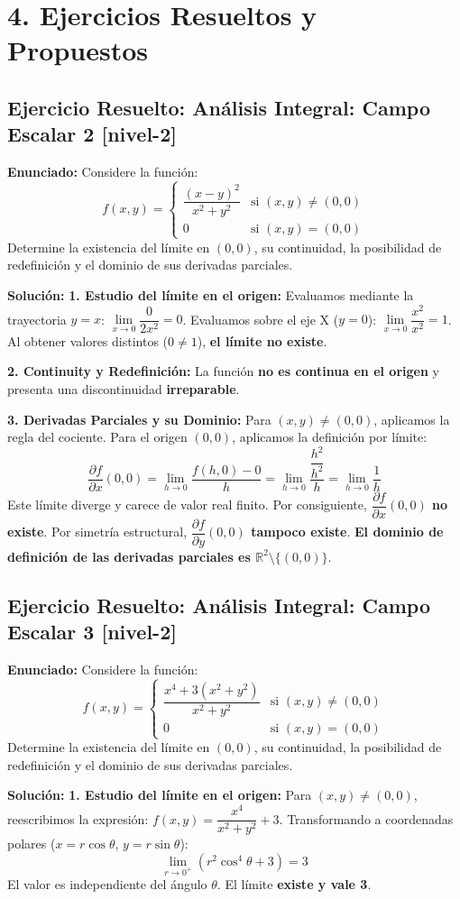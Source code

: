 \documentclass[11pt]{article}
\newenvironment{ejercicios}{%
  \section*{4. Ejercicios Resueltos y Propuestos}%
}{}
\newenvironment{ejercicioresuelto}[2]{\subsection*{Ejercicio Resuelto: #1 \small{[#2]}}}{}
\newcommand{\enunciado}[1]{\textbf{Enunciado:} #1\par\vspace{0.2cm}}
\newcommand{\solucion}[1]{\textbf{Solución:} #1\par\vspace{0.4cm}}
\begin{document}
\begin{ejercicios}
  \begin{ejercicioresuelto}{Análisis Integral: Campo Escalar 2}{nivel-2}
    \enunciado{
      Considere la función:
      $$ f(x,y) = \begin{cases} \displaystyle \dfrac{(x-y)^2}{x^2 + y^2} & \text{si } (x,y) \neq (0,0) \\[1em] 0 & \text{si } (x,y) = (0,0) \end{cases} $$
      Determine la existencia del límite en $(0,0)$, su continuidad, la posibilidad de redefinición y el dominio de sus derivadas parciales.
    }
    \solucion{
      \textbf{1. Estudio del límite en el origen:} 
      Evaluamos mediante la trayectoria $y = x$: $\displaystyle \lim\limits_{x \to 0} \displaystyle \dfrac{0}{2x^2} = 0$.
      Evaluamos sobre el eje X ($y=0$): $\displaystyle \lim\limits_{x \to 0} \displaystyle \dfrac{x^2}{x^2} = 1$.
      Al obtener valores distintos ($0 \neq 1$), \textbf{el límite no existe}.
      
      \textbf{2. Continuity y Redefinición:}
      La función \textbf{no es continua en el origen} y presenta una discontinuidad \textbf{irreparable}.
      
      \textbf{3. Derivadas Parciales y su Dominio:}
      Para $(x,y) \neq (0,0)$, aplicamos la regla del cociente.
      Para el origen $(0,0)$, aplicamos la definición por límite:
      $$ \displaystyle \dfrac{\partial f}{\partial x}(0,0) = \displaystyle \lim\limits_{h \to 0} \displaystyle \dfrac{f(h,0) - 0}{h} = \displaystyle \lim\limits_{h \to 0} \displaystyle \dfrac{\displaystyle \dfrac{h^2}{h^2}}{h} = \displaystyle \lim\limits_{h \to 0} \displaystyle \dfrac{1}{h} $$
      Este límite diverge y carece de valor real finito. Por consiguiente, \textbf{$\dfrac{\partial f}{\partial x}(0,0)$ no existe}. 
      Por simetría estructural, \textbf{$\dfrac{\partial f}{\partial y}(0,0)$ tampoco existe}.
      \textbf{El dominio de definición de las derivadas parciales es $\mathbb{R}^2 \setminus \{(0,0)\}$}.
    }
  \end{ejercicioresuelto}

  \begin{ejercicioresuelto}{Análisis Integral: Campo Escalar 3}{nivel-2}
    \enunciado{
      Considere la función:
      $$ f(x,y) = \begin{cases} \displaystyle \dfrac{x^4 + 3(x^2 + y^2)}{x^2 + y^2} & \text{si } (x,y) \neq (0,0) \\[1em] 0 & \text{si } (x,y) = (0,0) \end{cases} $$
      Determine la existencia del límite en $(0,0)$, su continuidad, la posibilidad de redefinición y el dominio de sus derivadas parciales.
    }
    \solucion{
      \textbf{1. Estudio del límite en el origen:} 
      Para $(x,y) \neq (0,0)$, reescribimos la expresión: $f(x,y) = \displaystyle \dfrac{x^4}{x^2+y^2} + 3$. Transformando a coordenadas polares ($x=r\cos\theta$, $y=r\sin\theta$):
      $$ \displaystyle \lim\limits_{r \to 0^+} (r^2\cos^4\theta + 3) = 3 $$
      El valor es independiente del ángulo $\theta$. El límite \textbf{existe y vale 3}.
      
}
\end{ejercicioresuelto}
\end{ejercicios}
\end{document}
